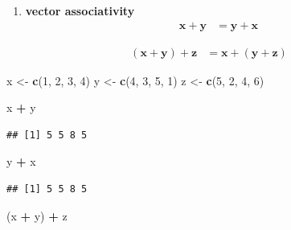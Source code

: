 \documentclass[
]{book}
\newenvironment{Shaded}{\begin{snugshade}}{\end{snugshade}}
\newcommand{\DecValTok}[1]{\textcolor[rgb]{0.00,0.00,0.81}{#1}}
\newcommand{\KeywordTok}[1]{\textcolor[rgb]{0.13,0.29,0.53}{\textbf{#1}}}
\newcommand{\NormalTok}[1]{#1}
\newcommand{\OperatorTok}[1]{\textcolor[rgb]{0.81,0.36,0.00}{\textbf{#1}}}
\newcommand{\StringTok}[1]{\textcolor[rgb]{0.31,0.60,0.02}{#1}}
\providecommand{\tightlist}{%
  \setlength{\itemsep}{0pt}\setlength{\parskip}{0pt}}
\theoremstyle{definition}
\theoremstyle{definition}
\theoremstyle{definition}
\theoremstyle{definition}
\theoremstyle{remark}
\begin{document}
\begin{enumerate}
\def\labelenumi{\arabic{enumi})}
\setcounter{enumi}{4}
\tightlist
\item
  \textbf{vector associativity}
  \[
  \begin{aligned}
  \mathbf{x} + \mathbf{y} & = \mathbf{y} + \mathbf{x}
  \end{aligned}
  \]
\end{enumerate}

\[
\begin{aligned}
(\mathbf{x} + \mathbf{y}) + \mathbf{z} & = \mathbf{x} + (\mathbf{y} + \mathbf{z})
\end{aligned}
\]

\begin{Shaded}
\begin{Highlighting}[]
\NormalTok{x <-}\StringTok{ }\KeywordTok{c}\NormalTok{(}\DecValTok{1}\NormalTok{, }\DecValTok{2}\NormalTok{, }\DecValTok{3}\NormalTok{, }\DecValTok{4}\NormalTok{)}
\NormalTok{y <-}\StringTok{ }\KeywordTok{c}\NormalTok{(}\DecValTok{4}\NormalTok{, }\DecValTok{3}\NormalTok{, }\DecValTok{5}\NormalTok{, }\DecValTok{1}\NormalTok{)}
\NormalTok{z <-}\StringTok{ }\KeywordTok{c}\NormalTok{(}\DecValTok{5}\NormalTok{, }\DecValTok{2}\NormalTok{, }\DecValTok{4}\NormalTok{, }\DecValTok{6}\NormalTok{)}

\NormalTok{x }\OperatorTok{+}\StringTok{ }\NormalTok{y}
\end{Highlighting}
\end{Shaded}

\begin{verbatim}
## [1] 5 5 8 5
\end{verbatim}

\begin{Shaded}
\begin{Highlighting}[]
\NormalTok{y }\OperatorTok{+}\StringTok{ }\NormalTok{x}
\end{Highlighting}
\end{Shaded}

\begin{verbatim}
## [1] 5 5 8 5
\end{verbatim}

\begin{Shaded}
\begin{Highlighting}[]
\NormalTok{(x }\OperatorTok{+}\StringTok{ }\NormalTok{y) }\OperatorTok{+}\StringTok{ }\NormalTok{z}
\end{Highlighting}
\end{Shaded}
\end{document}
